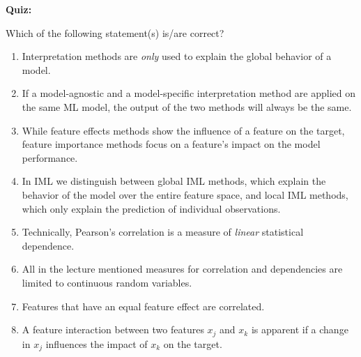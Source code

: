 \textbf{Quiz:}\\ \noindent
\vspace{0.1cm}

Which of the following statement(s) is/are correct?  
        	\begin{enumerate}
        	\item Interpretation methods are \textit{only} used to explain the global behavior of a model. 
        	\item If a model-agnostic and a model-specific interpretation method are applied on the same ML model, the output of the two methods will always be the same.
        	\item While feature effects methods show the influence of a feature on the target, feature importance methods focus on a feature's impact on the model performance.
        	\item In IML we distinguish between global IML methods, which explain the behavior of the model over the entire feature space, and local IML methods, which only explain the prediction of individual observations. 
        	\item Technically, Pearson's correlation is a measure of \textit{linear} statistical dependence. 
        	\item All in the lecture mentioned measures for correlation and dependencies are limited to continuous random variables.
        	\item Features that have an equal feature effect are correlated. 
        	\item A feature interaction between two features $x_j$ and $x_k$ is apparent if a change in $x_j$ influences the impact of $x_k$ on the target.
        \end{enumerate}